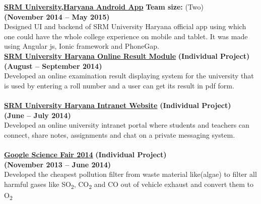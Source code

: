 \documentclass[margin,line]{res}
\begin{document}
\begin{resume}
{\bf \href{https://github.com/sagunesh/SRM-University-Android-App}{ SRM University,Haryana Android App}}\hfill  { \bf Team size: }{(Two)} \\{\bf (November 2014 -- May 2015)}\\
Designed UI and backend of SRM University Haryana official app using which one could have the whole college experience on mobile and tablet. It was made using Angular js, Ionic framework and PhoneGap.\\

{\bf \href{https://github.com/sagunesh/SRM-University-Management-System/tree/master/online-result-module}{ SRM University Haryana Online Result Module}} \hfill {\bf(Individual Project)}\\{\bf(August -- September 2014)}\\
Developed an online examination result displaying system for the university that is used by entering a roll number and a user can get its result in pdf form.\\\\

{\bf \href{https://github.com/sagunesh/SRM-University-Management-System}{SRM University Haryana Intranet Website}} \hfill {\bf(Individual Project)}\\{\bf(June -- July 2014)}\\
Developed an online university intranet portal where students and teachers can connect, share notes, assignments and chat on a private messaging system. \\\\

{\bf  \href{https://drive.google.com/file/d/1xFzl_syoqi-URgJgDWmmM52WXdXly-XV/view}{Google Science Fair 2014}} \hfill{ \bf (Individual Project) }\\{\bf(November 2013 -- June 2014)}\\
Developed the cheapest pollution filter from waste material like(algae) to filter all harmful gases like SO\textsubscript{2},  CO\textsubscript{2} and CO out of  vehicle exhaust and convert them to O\textsubscript{2}\\







\end{resume}
\end{document}
